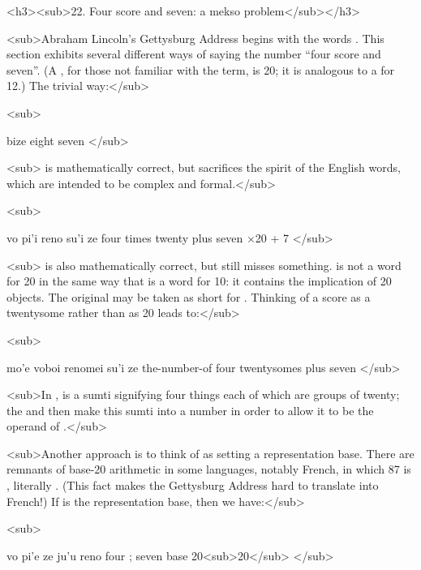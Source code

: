 <h3><sub>22. Four score and seven: a mekso problem</sub></h3>

<sub>Abraham Lincoln's Gettysburg Address begins with the
    words . This section exhibits
    several different ways of saying the number ``four score and
    seven''. (A , for those not familiar with the term, is
    20; it is analogous to a  for 12.) The trivial
    way:</sub>

<sub>
\begin{example}
bize\n
eight seven
</sub>
\end{example}

<sub> is mathematically
    correct, but sacrifices the spirit of the English words, which
    are intended to be complex and formal.</sub>

<sub>
\begin{example}
vo pi'i reno su'i ze\n
four times twenty plus seven $\times$20 + 7
</sub>
\end{example}

<sub> is also mathematically
    correct, but still misses something.  is not a word
    for 20 in the same way that  is a word for 10: it
    contains the implication of 20 objects. The original may be
    taken as short for .
    Thinking of a score as a twentysome rather than as 20 leads
    to:</sub>

<sub>
\begin{example}
mo'e voboi renomei su'i ze\n
the-number-of four twentysomes plus seven
</sub>
\end{example}

<sub>In , 
    is a sumti signifying four things each of which are groups of
    twenty; the  and  then make this sumti into a
    number in order to allow it to be the operand of
    .</sub>

<sub>Another approach is to think of  as setting a
    representation base. There are remnants of base-20 arithmetic
    in some languages, notably French, in which 87 is
    , literally . (This
    fact makes the Gettysburg Address hard to translate into
    French!) If  is the representation base, then we
    have:</sub>

<sub>
\begin{example}
vo pi'e ze ju'u reno\n
four ; seven base 20<sub>20</sub>
</sub>
\end{example}

